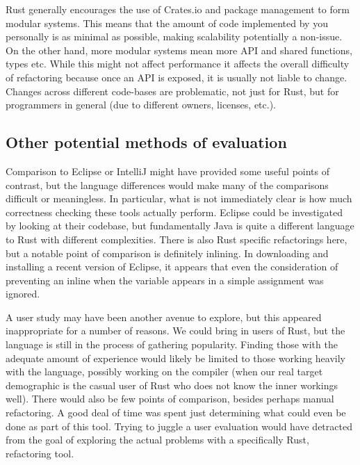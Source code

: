Rust generally encourages the use of Crates.io and package management to form modular systems. This means that the amount of code implemented by you personally is as minimal as possible, making scalability potentially a non-issue. On the other hand, more modular systems mean more API and shared functions, types etc. While this might not affect performance it affects the overall difficulty of refactoring because once an API is exposed, it is usually not liable to change. Changes across different code-bases are problematic, not just for Rust, but for programmers in general (due to different owners, licenses, etc.).





\subsection{Other potential methods of evaluation} \label{S:otherstuff}
Comparison to Eclipse or IntelliJ might have provided some useful points of contrast, but the language differences would make many of the comparisons difficult or meaningless. In particular, what is not immediately clear is how much correctness checking these tools actually perform. Eclipse could be investigated by looking at their codebase, but fundamentally Java is quite a different language to Rust with different complexities. There is also Rust specific refactorings here, but a notable point of comparison is definitely inlining. In downloading and installing a recent version of Eclipse, it appears that even the consideration of preventing an inline when the variable appears in a simple assignment was ignored.

A user study may have been another avenue to explore, but this appeared inappropriate for a number of reasons. We could bring in users of Rust, but the language is still in the process of gathering popularity. Finding those with the adequate amount of experience would likely be limited to those working heavily with the language, possibly working on the compiler (when our real target demographic is the casual user of Rust who does not know the inner workings well). There would also be few points of comparison, besides perhaps manual refactoring. A good deal of time was spent just determining what could even be done as part of this tool. Trying to juggle a user evaluation would have detracted from the goal of exploring the actual problems with a specifically Rust, refactoring tool. 
